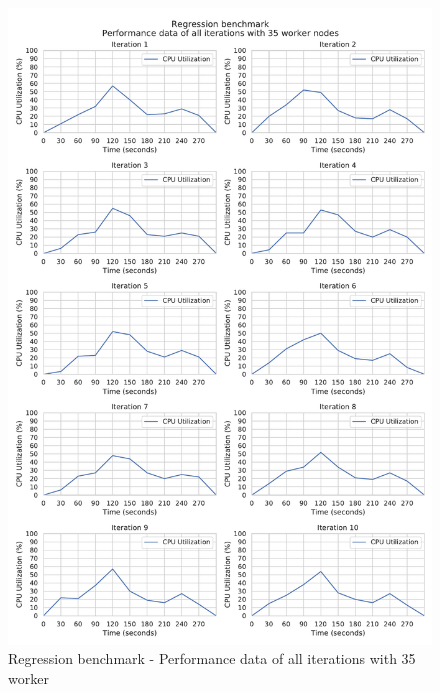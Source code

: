 \begin{figure}[h]
\centering
\includegraphics[scale=0.5]{images/appendix/evaluation_data/regression_benchmark/regression_35_worker_cpu_performance}
\caption{Regression benchmark - Performance data of all iterations with 35 worker}
\label{fig:appendix_eval_regression_static35}
\end{figure}

